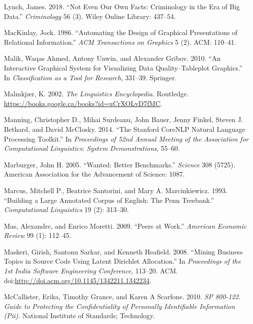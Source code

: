\documentclass[]{krantz}
\begin{document}
\hypertarget{ref-lynch2018}{}
Lynch, James. 2018. ``Not Even Our Own Facts: Criminology in the Era of
Big Data.'' \emph{Criminology} 56 (3). Wiley Online Library: 437--54.

\hypertarget{ref-mackinlay1986automating}{}
MacKinlay, Jock. 1986. ``Automating the Design of Graphical
Presentations of Relational Information.'' \emph{ACM Transactions on
Graphics} 5 (2). ACM: 110--41.

\hypertarget{ref-malik2010interactive}{}
Malik, Waqas Ahmed, Antony Unwin, and Alexander Gribov. 2010. ``An
Interactive Graphical System for Visualizing Data Quality--Tableplot
Graphics.'' In \emph{Classification as a Tool for Research}, 331--39.
Springer.

\hypertarget{ref-malmkjar-02}{}
Malmkjær, K. 2002. \emph{The Linguistics Encyclopedia}. Routledge.
\url{https://books.google.ca/books?id=uCrXOLvD7fMC}.

\hypertarget{ref-manning2014stanford}{}
Manning, Christopher D., Mihai Surdeanu, John Bauer, Jenny Finkel,
Steven J. Bethard, and David McClosky. 2014. ``The Stanford CoreNLP
Natural Language Processing Toolkit.'' In \emph{Proceedings of 52nd
Annual Meeting of the Association for Computational Linguistics: System
Demonstrations}, 55--60.

\hypertarget{ref-marburger2005wanted}{}
Marburger, John H. 2005. ``Wanted: Better Benchmarks.'' \emph{Science}
308 (5725). American Association for the Advancement of Science: 1087.

\hypertarget{ref-marcus-93}{}
Marcus, Mitchell P., Beatrice Santorini, and Mary A. Marcinkiewicz.
1993. ``Building a Large Annotated Corpus of English: The Penn
Treebank.'' \emph{Computational Linguistics} 19 (2): 313--30.

\hypertarget{ref-mas2009peers}{}
Mas, Alexandre, and Enrico Moretti. 2009. ``Peers at Work.''
\emph{American Economic Review} 99 (1): 112--45.

\hypertarget{ref-maskeri-08}{}
Maskeri, Girish, Santonu Sarkar, and Kenneth Heafield. 2008. ``Mining
Business Topics in Source Code Using Latent Dirichlet Allocation.'' In
\emph{Proceedings of the 1st India Software Engineering Conference},
113--20. ACM.
doi:\href{https://doi.org/http://doi.acm.org/10.1145/1342211.1342234}{http://doi.acm.org/10.1145/1342211.1342234}.

\hypertarget{ref-mccallister2010sp}{}
McCallister, Erika, Timothy Grance, and Karen A Scarfone. 2010. \emph{SP
800-122. Guide to Protecting the Confidentiality of Personally
Identifiable Information (Pii)}. National Institute of Standards;
Technology.
\end{document}
